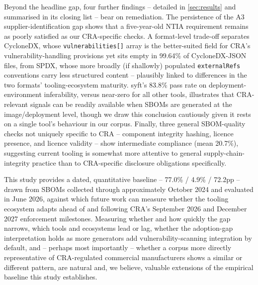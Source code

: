 \documentclass[11pt]{article}
\begin{document}
Beyond the headline gap, four further findings -- detailed in \cref{sec:results} and summarised in its closing list -- bear on remediation. The persistence of the A3 supplier-identification gap shows that a five-year-old NTIA requirement remains as poorly satisfied as our CRA-specific checks. A format-level trade-off separates CycloneDX, whose \texttt{vulnerabilities[]} array is the better-suited field for CRA's vulnerability-handling provisions yet sits empty in 99.64\% of CycloneDX-JSON files, from SPDX, whose more broadly (if shallowly) populated \texttt{externalRefs} conventions carry less structured content -- plausibly linked to differences in the two formats' tooling-ecosystem maturity. syft's 83.8\% pass rate on deployment-environment inferability, versus near-zero for all other tools, illustrates that CRA-relevant signals can be readily available when SBOMs are generated at the image/deployment level, though we draw this conclusion cautiously given it rests on a single tool's behaviour in our corpus. Finally, three general SBOM-quality checks not uniquely specific to CRA -- component integrity hashing, licence presence, and licence validity -- show intermediate compliance (mean 20.7\%), suggesting current tooling is somewhat more attentive to general supply-chain-integrity practice than to CRA-specific disclosure obligations specifically.

This study provides a dated, quantitative baseline -- 77.0\% / 4.9\% / 72.2pp -- drawn from SBOMs collected through approximately October 2024 and evaluated in June 2026, against which future work can measure whether the tooling ecosystem adapts ahead of and following CRA's September 2026 and December 2027 enforcement milestones. Measuring whether and how quickly the gap narrows, which tools and ecosystems lead or lag, whether the adoption-gap interpretation holds as more generators add vulnerability-scanning integration by default, and -- perhaps most importantly -- whether a corpus more directly representative of CRA-regulated commercial manufacturers shows a similar or different pattern, are natural and, we believe, valuable extensions of the empirical baseline this study establishes.



\end{document}
